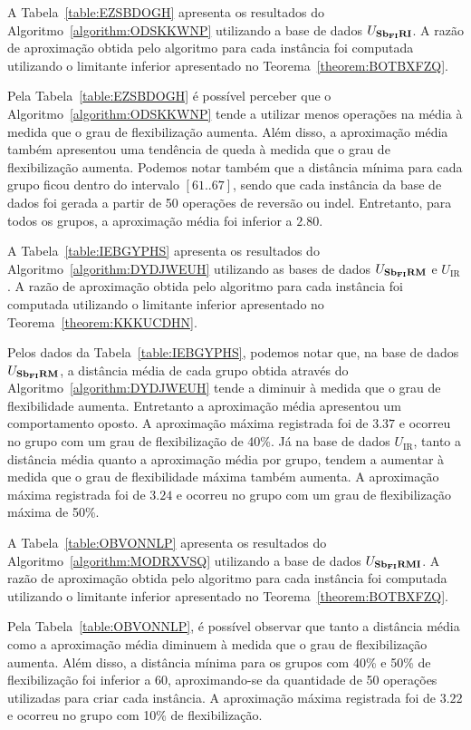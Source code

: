 A Tabela~\ref{table:EZSBDOGH} apresenta os resultados do Algoritmo~\ref{algorithm:ODSKKWNP} utilizando a base de dados $U_{\textbf{Sb\textsubscript{FI}RI}}{}$. A razão de aproximação obtida pelo algoritmo para cada instância foi computada utilizando o limitante inferior apresentado no Teorema~\ref{theorem:BOTBXFZQ}.



Pela Tabela~\ref{table:EZSBDOGH} é possível perceber que o Algoritmo~\ref{algorithm:ODSKKWNP} tende a utilizar menos operações na média à medida que o grau de flexibilização aumenta. Além disso, a aproximação média também apresentou uma tendência de queda à medida que o grau de flexibilização aumenta. Podemos notar também que a distância mínima para cada grupo ficou dentro do intervalo $[61..67]$, sendo que cada instância da base de dados foi gerada a partir de 50 operações de reversão ou indel. Entretanto, para todos os grupos, a aproximação média foi inferior a $2.80$.

A Tabela~\ref{table:IEBGYPHS} apresenta os resultados do Algoritmo~\ref{algorithm:DYDJWEUH} utilizando as bases de dados $U_{\textbf{Sb\textsubscript{FI}RM}}{}$ e $U_{\text{IR}}$. A razão de aproximação obtida pelo algoritmo para cada instância foi computada utilizando o limitante inferior apresentado no Teorema~\ref{theorem:KKKUCDHN}.



Pelos dados da Tabela~\ref{table:IEBGYPHS}, podemos notar que, na base de dados $U_{\textbf{Sb\textsubscript{FI}RM}}{}$, a distância média de cada grupo obtida através do Algoritmo~\ref{algorithm:DYDJWEUH} tende a diminuir à medida que o grau de flexibilidade aumenta. Entretanto a aproximação média apresentou um comportamento oposto. A aproximação máxima registrada foi de $3.37$ e ocorreu no grupo com um grau de flexibilização de 40\%. Já na base de dados $U_{\text{IR}}$, tanto a distância média quanto a aproximação média por grupo, tendem a aumentar à medida que o grau de flexibilidade máxima também aumenta. A aproximação máxima registrada foi de $3.24$ e ocorreu no grupo com um grau de flexibilização máxima de 50\%.

A Tabela~\ref{table:OBVONNLP} apresenta os resultados do Algoritmo~\ref{algorithm:MODRXVSQ} utilizando a base de dados $U_{\textbf{Sb\textsubscript{FI}RMI}}{}$. A razão de aproximação obtida pelo algoritmo para cada instância foi computada utilizando o limitante inferior apresentado no Teorema~\ref{theorem:BOTBXFZQ}.



Pela Tabela~\ref{table:OBVONNLP}, é possível observar que tanto a distância média como a aproximação média diminuem à medida que o grau de flexibilização aumenta. Além disso, a distância mínima para os grupos com 40\% e 50\% de flexibilização foi inferior a 60, aproximando-se da quantidade de 50 operações utilizadas para criar cada instância. A aproximação máxima registrada foi de $3.22$ e ocorreu no grupo com 10\% de flexibilização.

